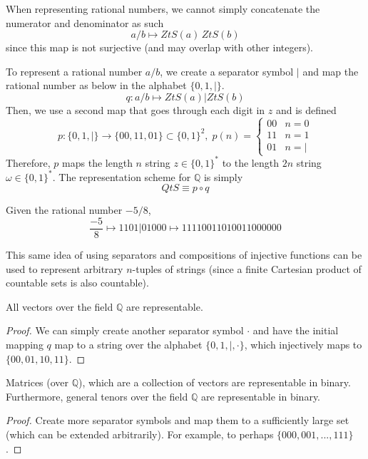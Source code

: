 \documentclass{article}
\begin{document}
  When representing rational numbers, we cannot simply concatenate the numerator and denominator as such
  \[a/b \mapsto ZtS(a) \, ZtS(b)\]
  since this map is not surjective (and may overlap with other integers). 

  \begin{definition}
  To represent a rational number $a/b$, we create a separator symbol $|$ and map the rational number as below in the alphabet $\{0, 1, |\}$. 
  \[q: a/b \mapsto ZtS(a) | ZtS(b)\]
  Then, we use a second map that goes through each digit in $z$ and is defined 
  \[p: \{0, 1, |\} \longrightarrow \{00,11,01\} \subset \{0, 1\}^2, \; p(n) = \begin{cases}
  00 & n = 0 \\
  11 & n = 1 \\
  01 & n = |
  \end{cases}\]
  Therefore, $p$ maps the length $n$ string $z \in \{0, 1\}^\ast$ to the length $2n$ string $\omega \in \{0, 1\}^\ast$. The representation scheme for $\mathbb{Q}$ is simply 
  \[QtS \equiv p \circ q\]
  \end{definition}

  \begin{example}
  Given the rational number $-5/8$,
  \[\frac{-5}{8} \mapsto 1101|01000 \mapsto 11110011010011000000\]
  \end{example}

  This same idea of using separators and compositions of injective functions can be used to represent arbitrary $n$-tuples of strings (since a finite Cartesian product of countable sets is also countable). 

  \begin{theorem}
  All vectors over the field $\mathbb{Q}$ are representable. 
  \end{theorem}
  \begin{proof}
  We can simply create another separator symbol $\cdot$ and have the initial mapping $q$ map to a string over the alphabet $\{0, 1, |, \cdot\}$, which injectively maps to $\{00, 01, 10, 11\}$. 
  \end{proof}

  \begin{corollary}
  Matrices (over $\mathbb{Q}$), which are a collection of vectors are representable in binary. Furthermore, general tenors over the field $\mathbb{Q}$ are representable in binary. 
  \end{corollary}
  \begin{proof}
  Create more separator symbols and map them to a sufficiently large set (which can be extended arbitrarily). For example, to perhaps $\{000, 001, ..., 111\}$. 
  \end{proof}
\end{document}
